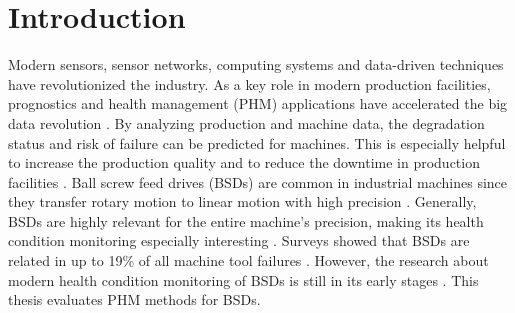 
\chapter{Introduction}
Modern sensors, sensor networks, computing systems and data-driven techniques have revolutionized the industry. As a key role in modern production facilities, prognostics and health management (PHM) applications have accelerated the big data revolution \cite{ZHAO2019213}. By analyzing production and machine data, the degradation status and risk of failure can be predicted for machines. This is especially helpful to increase the production quality and to reduce the downtime in production facilities \cite{Denkena2021}. Ball screw feed drives (BSDs) are common in industrial machines since they transfer rotary motion to linear motion with high precision \cite{LiPin2018}. Generally, BSDs are highly relevant for the entire machine’s precision, making its health condition monitoring especially interesting \cite{LiPin2018}. Surveys showed that BSDs are related in up to 19\% of all machine tool failures \cite{Denkena2021}. However, the research about modern health condition monitoring of BSDs is still in its early stages \cite{LiPin2018}. This thesis evaluates PHM methods for BSDs.


